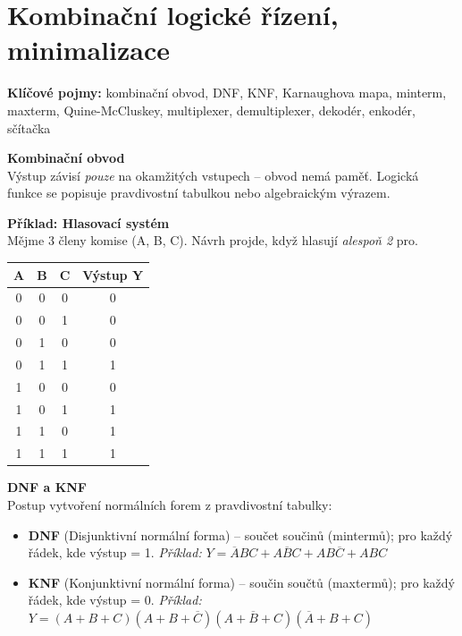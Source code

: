\documentclass[a4paper,10pt]{article}
\begin{document}
\section{Kombinační logické řízení, minimalizace}

\begin{pojmybox}
\textbf{Klíčové pojmy:}
kombinační obvod, DNF, KNF, Karnaughova mapa, minterm, maxterm,
Quine-McCluskey, multiplexer, demultiplexer, dekodér, enkodér, sčítačka
\end{pojmybox}

\begin{vysvetlenibox}
\textbf{Kombinační obvod}\\
Výstup závisí \textit{pouze} na okamžitých vstupech -- obvod nemá paměť.
Logická funkce se popisuje pravdivostní tabulkou nebo algebraickým výrazem.

\textbf{Příklad: Hlasovací systém}\\
Mějme 3 členy komise (A, B, C). Návrh projde, když hlasují \textit{alespoň 2} pro.
\begin{center}
\begin{tabular}{ccc|c}
    \toprule
    A & B & C & Výstup Y \\
    \midrule
    0 & 0 & 0 & 0 \\
    0 & 0 & 1 & 0 \\
    0 & 1 & 0 & 0 \\
    0 & 1 & 1 & 1 \\
    1 & 0 & 0 & 0 \\
    1 & 0 & 1 & 1 \\
    1 & 1 & 0 & 1 \\
    1 & 1 & 1 & 1 \\
    \bottomrule
\end{tabular}
\end{center}

\textbf{DNF a KNF}\\
Postup vytvoření normálních forem z pravdivostní tabulky:
\begin{itemize}[noitemsep, leftmargin=1.4em, topsep=4pt]
    \item \textbf{DNF} (Disjunktivní normální forma) -- součet součinů
          (mintermů); pro každý řádek, kde výstup = 1.
          \textit{Příklad:} $Y = \overline{A}BC + A\overline{B}C + AB\overline{C} + ABC$
    \item \textbf{KNF} (Konjunktivní normální forma) -- součin součtů
          (maxtermů); pro každý řádek, kde výstup = 0.
          \textit{Příklad:} $Y = (A+B+C)(A+B+\overline{C})(A+\overline{B}+C)(\overline{A}+B+C)$
\end{itemize}


\end{vysvetlenibox}
\end{document}

